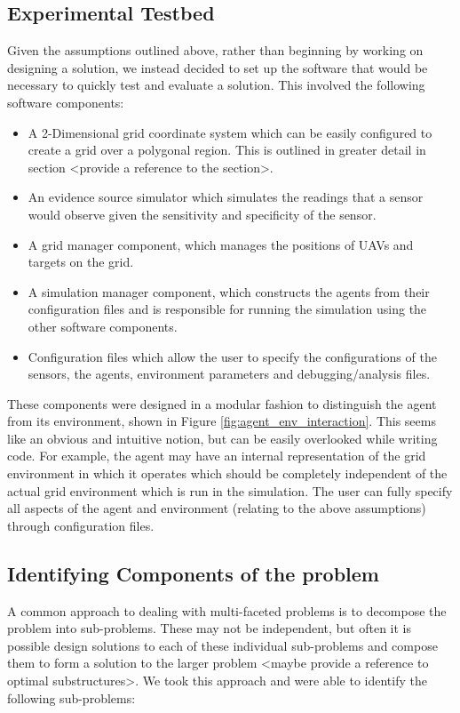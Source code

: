 \subsection{Experimental Testbed}
Given the assumptions outlined above, rather than beginning by working on designing a solution, we instead decided to set up the software that would be necessary to quickly test and evaluate a solution. This involved the following software components:
\begin{itemize}
    \item A 2-Dimensional grid coordinate system which can be easily configured to create a grid over a polygonal region. This is outlined in greater detail in section <provide a reference to the section>.
    \item An evidence source simulator which simulates the readings that a sensor would observe given the sensitivity and specificity of the sensor.
    \item A grid manager component, which manages the positions of UAVs and targets on the grid.
    \item A simulation manager component, which constructs the agents from their configuration files and is responsible for running the simulation using the other software components.
    \item Configuration files which allow the user to specify the configurations of the sensors, the agents, environment parameters and debugging/analysis files.
\end{itemize}
These components were designed in a modular fashion to distinguish the agent from its environment, shown in Figure \ref{fig:agent_env_interaction}. This seems like an obvious and intuitive notion, but can be easily overlooked while writing code. For example, the agent may have an internal representation of the grid environment in which it operates which should be completely independent of the actual grid environment which is run in the simulation. The user can fully specify all aspects of the agent and environment (relating to the above assumptions) through configuration files.

\subsection{Identifying Components of the problem}

A common approach to dealing with multi-faceted problems is to decompose the problem into sub-problems. These may not be independent, but often it is possible design solutions to each of these individual sub-problems and compose them to form a solution to the larger problem <maybe provide a reference to optimal substructures>. We took this approach and were able to identify the following sub-problems:

